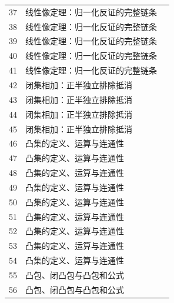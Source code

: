 \documentclass[11pt,a4paper]{article}
\theoremstyle{definition}\newtheorem{definition}{定义}\newtheorem{example}{例}
\begin{document}
\begin{longtable}{r p{.66\linewidth} r}
37 & 线性像定理：归一化反证的完整链条 & \pageref{g:109:37}\\

38 & 线性像定理：归一化反证的完整链条 & \pageref{g:109:37}\\

39 & 线性像定理：归一化反证的完整链条 & \pageref{g:109:37}\\

40 & 线性像定理：归一化反证的完整链条 & \pageref{g:109:37}\\

41 & 线性像定理：归一化反证的完整链条 & \pageref{g:109:37}\\

42 & 闭集相加：正半独立排除抵消 & \pageref{g:109:42}\\

43 & 闭集相加：正半独立排除抵消 & \pageref{g:109:42}\\

44 & 闭集相加：正半独立排除抵消 & \pageref{g:109:42}\\

45 & 闭集相加：正半独立排除抵消 & \pageref{g:109:42}\\

46 & 凸集的定义、运算与连通性 & \pageref{g:109:46}\\

47 & 凸集的定义、运算与连通性 & \pageref{g:109:46}\\

48 & 凸集的定义、运算与连通性 & \pageref{g:109:46}\\

49 & 凸集的定义、运算与连通性 & \pageref{g:109:46}\\

50 & 凸集的定义、运算与连通性 & \pageref{g:109:46}\\

51 & 凸集的定义、运算与连通性 & \pageref{g:109:46}\\

52 & 凸集的定义、运算与连通性 & \pageref{g:109:46}\\

53 & 凸集的定义、运算与连通性 & \pageref{g:109:46}\\

54 & 凸集的定义、运算与连通性 & \pageref{g:109:46}\\

55 & 凸包、闭凸包与凸包和公式 & \pageref{g:109:55}\\

56 & 凸包、闭凸包与凸包和公式 & \pageref{g:109:55}\\


\end{longtable}
\end{document}
